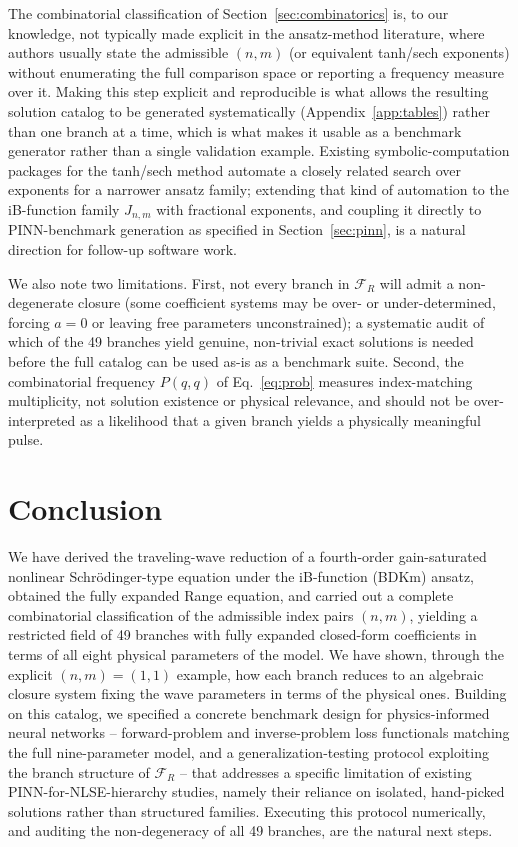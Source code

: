 \documentclass[11pt]{article}
\begin{document}
The combinatorial classification of Section~\ref{sec:combinatorics} is, to our
knowledge, not typically made explicit in the ansatz-method literature, where
authors usually state the admissible $(n,m)$ (or equivalent tanh/sech exponents) without
enumerating the full comparison space or reporting a frequency measure over it. Making
this step explicit and reproducible is what allows the resulting solution catalog to be
generated systematically (Appendix~\ref{app:tables}) rather than one branch at a time,
which is what makes it usable as a benchmark generator rather than a single validation
example. Existing symbolic-computation packages for the tanh/sech method
\citep{baldwin2004} automate a closely related search over exponents for a narrower
ansatz family; extending that kind of automation to the iB-function family
$J_{n,m}$ with fractional exponents, and coupling it directly to PINN-benchmark
generation as specified in Section~\ref{sec:pinn}, is a natural direction for follow-up
software work.

We also note two limitations. First, not every branch in $\mathcal{F}_R$ will admit a
non-degenerate closure (some coefficient systems may be over- or under-determined,
forcing $a=0$ or leaving free parameters unconstrained); a systematic audit of which of
the 49 branches yield genuine, non-trivial exact solutions is needed before the full
catalog can be used as-is as a benchmark suite. Second, the combinatorial frequency
$P(q,q)$ of Eq.~\eqref{eq:prob} measures index-matching multiplicity, not solution
existence or physical relevance, and should not be over-interpreted as a likelihood that
a given branch yields a physically meaningful pulse.

\section{Conclusion}

We have derived the traveling-wave reduction of a fourth-order gain-saturated nonlinear
Schr\"odinger-type equation under the iB-function (BDKm) ansatz, obtained the fully
expanded Range equation, and carried out a complete combinatorial classification of the
admissible index pairs $(n,m)$, yielding a restricted field of 49 branches with fully
expanded closed-form coefficients in terms of all eight physical parameters of the
model. We have shown, through the explicit $(n,m)=(1,1)$ example, how each branch reduces
to an algebraic closure system fixing the wave parameters in terms of the physical
ones. Building on this catalog, we specified a concrete benchmark design for
physics-informed neural networks -- forward-problem and inverse-problem loss functionals
matching the full nine-parameter model, and a generalization-testing protocol exploiting
the branch structure of $\mathcal{F}_R$ -- that addresses a specific limitation of
existing PINN-for-NLSE-hierarchy studies, namely their reliance on isolated,
hand-picked solutions rather than structured families. Executing this protocol
numerically, and auditing the non-degeneracy of all 49 branches, are the natural next
steps.
\end{document}
